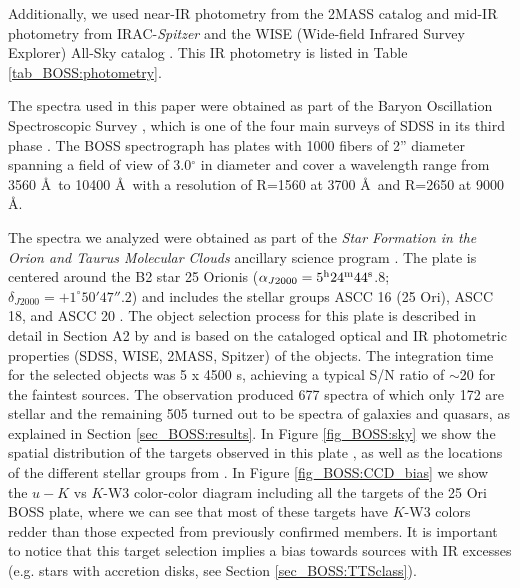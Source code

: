 \documentclass[12pt]{article}
\newcounter{subsubsubsection}[subsubsection]
\begin{document}
Additionally, we used near-IR photometry from the 2MASS catalog \citep{Skrutskie2006} and mid-IR photometry from IRAC-\textit{Spitzer} \citep[][]{Hernandez2007b} and the \ac{WISE} (Wide-field Infrared Survey Explorer) All-Sky catalog \citep{Cutri2013}. This IR photometry is listed in Table \ref{tab_BOSS:photometry}.

\label{sec_BOSS:spectroscopy}
The spectra used in this paper were obtained as part of the Baryon Oscillation Spectroscopic Survey \citep[\ac{BOSS}; ][]{Dawson2013}, which is one of the four main surveys of SDSS \citep[][]{York2000} in its third phase \citep[SDSS-III; ][]{Eisenstein2011}. The BOSS spectrograph has plates with 1000 fibers of 2'' diameter spanning a field of view of 3.0$^\circ$ in diameter and cover a wavelength range from 3560 \AA\ to 10400 \AA\ with a resolution of R=1560 at 3700 \AA\ and R=2650 at 9000 \AA \citep{Gunn2006,Smee2013}. 

The spectra we analyzed were obtained as part of the {\it Star Formation in the Orion and Taurus Molecular Clouds} ancillary science program \citep{Alam2015}. The plate is centered around the B2 star 25 Orionis ($\alpha_{J2000}= 5^{\rm h} 24^{\rm m} 44^{\rm s}$.8; $\delta_{J2000} = +1^{\circ} 50' 47''.2$) and includes the stellar groups ASCC 16 (25 Ori), ASCC 18, and ASCC 20 \citep{Kharchenko2013}. The object selection process for this plate is described in detail in Section A2 by \citet{Alam2015} and is based on the cataloged optical and IR photometric properties (SDSS, WISE, 2MASS, Spitzer) of the objects. The integration time for the selected objects was 5 x 4500 s, achieving a typical S/N ratio of $\sim$20 for the faintest sources. The observation produced 677 spectra of which only 172 are stellar and the remaining 505 turned out to be spectra of galaxies and quasars, as explained in Section \ref{sec_BOSS:results}. In Figure \ref{fig_BOSS:sky} we show the spatial distribution of the targets observed in this plate \citep{Alam2015}, as well as the locations of the different stellar groups from \citet{Kharchenko2013}. In Figure \ref{fig_BOSS:CCD_bias} we show the $u-K$ vs $K$-W3 color-color diagram including all the targets of the 25 Ori BOSS plate, where we can see that most of these targets have $K$-W3 colors redder than those expected from previously confirmed members. It is important to notice that this target selection implies a bias towards sources with IR excesses (e.g. stars with accretion disks, see Section \ref{sec_BOSS:TTSclass}).
\end{document}
